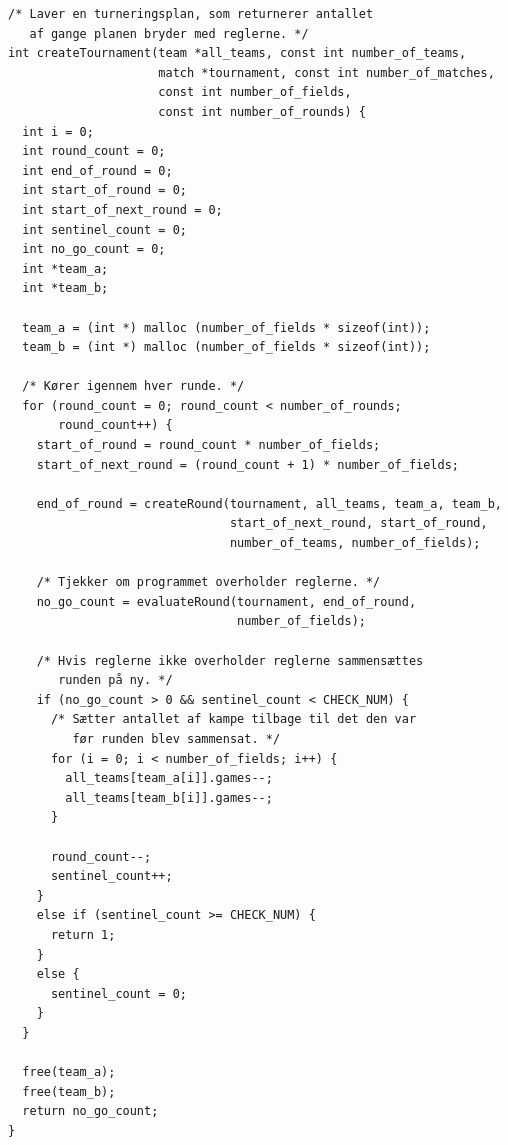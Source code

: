 \begin{listing}[H]
\begin{verbatim} 
/* Laver en turneringsplan, som returnerer antallet 
   af gange planen bryder med reglerne. */
int createTournament(team *all_teams, const int number_of_teams, 
                     match *tournament, const int number_of_matches, 
                     const int number_of_fields, 
                     const int number_of_rounds) {
  int i = 0;
  int round_count = 0;
  int end_of_round = 0;
  int start_of_round = 0;
  int start_of_next_round = 0;
  int sentinel_count = 0;
  int no_go_count = 0;
  int *team_a;
  int *team_b;

  team_a = (int *) malloc (number_of_fields * sizeof(int));
  team_b = (int *) malloc (number_of_fields * sizeof(int));

  /* Kører igennem hver runde. */
  for (round_count = 0; round_count < number_of_rounds; 
       round_count++) {
    start_of_round = round_count * number_of_fields;
    start_of_next_round = (round_count + 1) * number_of_fields;

    end_of_round = createRound(tournament, all_teams, team_a, team_b, 
                               start_of_next_round, start_of_round, 
                               number_of_teams, number_of_fields);

    /* Tjekker om programmet overholder reglerne. */
    no_go_count = evaluateRound(tournament, end_of_round, 
                                number_of_fields);

    /* Hvis reglerne ikke overholder reglerne sammensættes
       runden på ny. */
    if (no_go_count > 0 && sentinel_count < CHECK_NUM) {
      /* Sætter antallet af kampe tilbage til det den var
         før runden blev sammensat. */
      for (i = 0; i < number_of_fields; i++) {
        all_teams[team_a[i]].games--;
        all_teams[team_b[i]].games--;
      }

      round_count--;
      sentinel_count++;
    }
    else if (sentinel_count >= CHECK_NUM) {
      return 1;
    }
    else {
      sentinel_count = 0;
    }
  }

  free(team_a);
  free(team_b);
  return no_go_count;
}
\end{verbatim}
\label{code:createTournament}
\end{listing}

